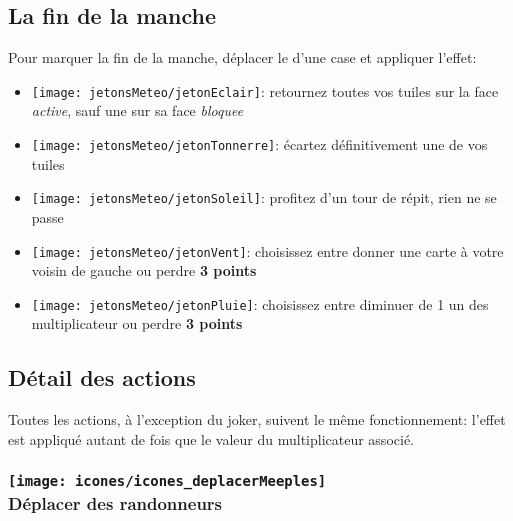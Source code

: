 \subsection*{La fin de la manche} \label{sec:finDeManche}
Pour marquer la fin de la manche, déplacer le \compteurManche d'une case et appliquer l'effet:
\begin{itemize}
\item \texttt{[image: jetonsMeteo/jetonEclair]}: retournez toutes vos tuiles sur la face \textit{active}, sauf une sur sa face \textit{bloquee}
\item \texttt{[image: jetonsMeteo/jetonTonnerre]}: écartez définitivement une de vos tuiles
\item \texttt{[image: jetonsMeteo/jetonSoleil]}: profitez d'un tour de répit, rien ne se passe
\item \texttt{[image: jetonsMeteo/jetonVent]}: choisissez entre donner une carte à votre voisin de gauche ou perdre \textbf{3 points}
\item \texttt{[image: jetonsMeteo/jetonPluie]}: choisissez entre diminuer de 1 un des multiplicateur ou perdre \textbf{3 points}
\end{itemize}

\subsection*{Détail des actions} \label{sec:actions}
Toutes les actions, à l'exception du joker, suivent le même fonctionnement: l'effet est appliqué autant de fois que le valeur du multiplicateur associé.
\subsubsection*{\texttt{[image: icones/icones\_deplacerMeeples]} \\ Déplacer des randonneurs}


